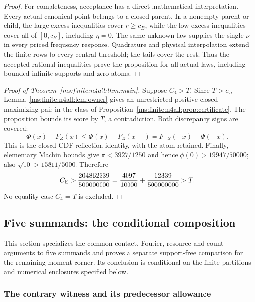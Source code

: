 \begin{proof}
For completeness, acceptance has a direct mathematical interpretation.
Every actual canonical point belongs to a closed parent.
In a nonempty parent or child, the large-excess inequalities cover
$\eta\ge c_B$, while the low-excess inequalities cover all of
$[0,c_B]$, including $\eta=0$. The same unknown law supplies the
single $\nu$ in every priced frequency response. Quadrature and
physical interpolation extend the finite rows to every central
threshold; the tails cover the rest. Thus the accepted rational
inequalities prove the proposition for all actual laws, including
bounded infinite supports and zero atoms.
\end{proof}

\begin{proof}[Proof of Theorem~\ref{ms:finite:n4all:thm:main}]
Suppose $C_4>T$. Since $T>c_0$, Lemma~\ref{ms:finite:n4all:lem:owner} gives
an unrestricted positive closed maximizing pair in the class of
Proposition~\ref{ms:finite:n4all:prop:certificate}. The proposition bounds its
score by $T$, a contradiction. Both discrepancy signs are covered:
\[
 \Phi(x)-F_Z(x)\le\Phi(x)-F_Z(x-)
                     =F_{-Z}(-x)-\Phi(-x).
\]
This is the closed-CDF reflection identity, with the atom retained.
Finally, elementary Machin bounds give $\pi<3927/1250$ and hence
$\phi(0)>19947/50000$; also $\sqrt{10}>15811/5000$. Therefore
\[
 C_{\mathrm E}>\frac{204862339}{500000000}
       =\frac{4097}{10000}+\frac{12339}{500000000}>T.
\]
No equality case $C_4=T$ is excluded.
\end{proof}


\subsection{Five summands: the conditional composition}
\label{ms:finite:five:section}

This section specializes the common contact, Fourier, resource and count
arguments to five summands and proves a separate support-free comparison
for the remaining moment corner. Its conclusion is conditional on the finite partitions and numerical
enclosures specified below.

\subsubsection{The contrary witness and its predecessor allowance}

